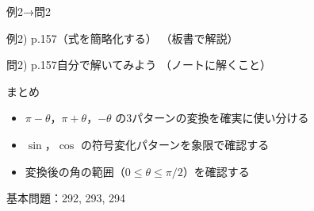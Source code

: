 \documentclass[aspectratio=43,professionalfonts,handout]{beamer}
\begin{document}
\begin{frame}{例2→問2}
  \begin{exampleblock}{例2) p.157（式を簡略化する）}
    （板書で解説）
  \end{exampleblock}

  \vfill

  \begin{block}{問2) p.157\quad 自分で解いてみよう}
    （ノートに解くこと）
  \end{block}
\end{frame}

\begin{frame}{まとめ}
  \begin{itemize}
    \item $\pi-\theta$，$\pi+\theta$，$-\theta$ の3パターンの変換を確実に使い分ける
    \item $\sin$，$\cos$ の符号変化パターンを象限で確認する
    \item 変換後の角の範囲（$0 \leq \theta \leq \pi/2$）を確認する
  \end{itemize}

  \vfill
  {\small 基本問題：292, 293, 294}
\end{frame}
\end{document}
